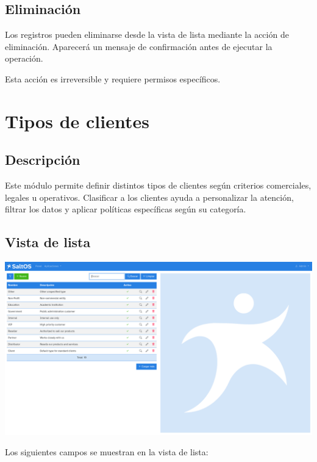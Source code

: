 \documentclass[a4paper]{article}
\begin{document}
\hypertarget{toc50}{}
\subsection{Eliminación}

Los registros pueden eliminarse desde la vista de lista mediante la acción de eliminación.
Aparecerá un mensaje de confirmación antes de ejecutar la operación.

Esta acción es irreversible y requiere permisos específicos.


\hypertarget{toc51}{}
\section{Tipos de clientes}

\hypertarget{toc52}{}
\subsection{Descripción}

Este módulo permite definir distintos tipos de clientes según criterios comerciales, legales u operativos.
Clasificar a los clientes ayuda a personalizar la atención, filtrar los datos y aplicar políticas específicas según su categoría.

\hypertarget{toc53}{}
\subsection{Vista de lista}

\begin{center}\includegraphics[width=1\textwidth]{../ujest/snaps/test-screenshots-js-screenshots-crm-customers-types-list-es-es-1-snap.png}\end{center}

Los siguientes campos se muestran en la vista de lista:
\end{document}
